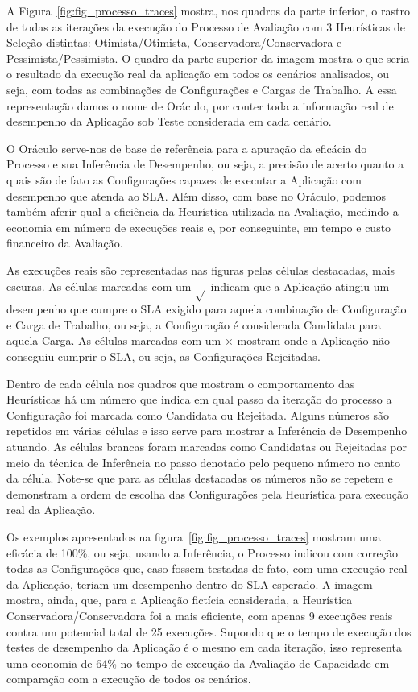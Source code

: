 A Figura~\ref{fig:fig_processo_traces} mostra, nos quadros da parte inferior, 
o rastro de todas as iterações da execução do Processo de Avaliação com 3 
Heurísticas de Seleção distintas: Otimista/Otimista, Conservadora/Conservadora e 
Pessimista/Pessimista. O quadro da parte superior da imagem mostra o que seria o
resultado da execução real da aplicação em todos os cenários analisados, ou seja,
com todas as combinações de Configurações e Cargas de Trabalho. A essa 
representação damos o nome de Oráculo, por conter toda a informação real de
desempenho da Aplicação sob Teste considerada em cada cenário.

O Oráculo serve-nos de base de referência para a apuração da eficácia do Processo
e sua Inferência de Desempenho, ou seja, a precisão de acerto quanto a quais são
de fato as Configurações capazes de executar a Aplicação com desempenho que atenda
ao SLA. Além disso, com base no Oráculo, podemos também aferir qual a eficiência 
da Heurística utilizada na Avaliação, medindo a economia em número de execuções
reais e, por conseguinte, em tempo e custo financeiro da Avaliação.

As execuções reais são representadas nas figuras pelas células destacadas, mais 
escuras. As células marcadas com um $\sqrt{}$ indicam que a Aplicação atingiu um
desempenho que cumpre o SLA exigido para aquela combinação de Configuração e Carga
de Trabalho, ou seja, a Configuração é considerada Candidata para aquela Carga. As
células marcadas com um $\times$ mostram onde a Aplicação não conseguiu cumprir 
o SLA, ou seja, as Configurações Rejeitadas.

Dentro de cada célula nos quadros que mostram o comportamento das Heurísticas há
um número que indica em qual passo da iteração do processo a Configuração foi
marcada como Candidata ou Rejeitada. Alguns números são repetidos em várias células
e isso serve para mostrar a Inferência de Desempenho atuando. As células brancas
foram marcadas como Candidatas ou Rejeitadas por meio da técnica de Inferência no
passo denotado pelo pequeno número no canto da célula. Note-se que para as células 
destacadas os números não se repetem e demonstram a ordem de escolha das Configurações
pela Heurística para execução real da Aplicação.

Os exemplos apresentados na figura~\ref{fig:fig_processo_traces} mostram uma eficácia
de 100\%, ou seja, usando a Inferência, o Processo indicou com correção todas as
Configurações que, caso fossem testadas de fato, com uma execução real da Aplicação,
teriam um desempenho dentro do SLA esperado. A imagem mostra, ainda, que, para a 
Aplicação fictícia considerada, a Heurística Conservadora/Conservadora foi a mais
eficiente, com apenas 9 execuções reais contra um potencial total de 25 execuções.
Supondo que o tempo de execução dos testes de desempenho da Aplicação é o mesmo 
em cada iteração, isso representa uma economia de 64\% no tempo de execução da
Avaliação de Capacidade em comparação com a execução de todos os cenários.

